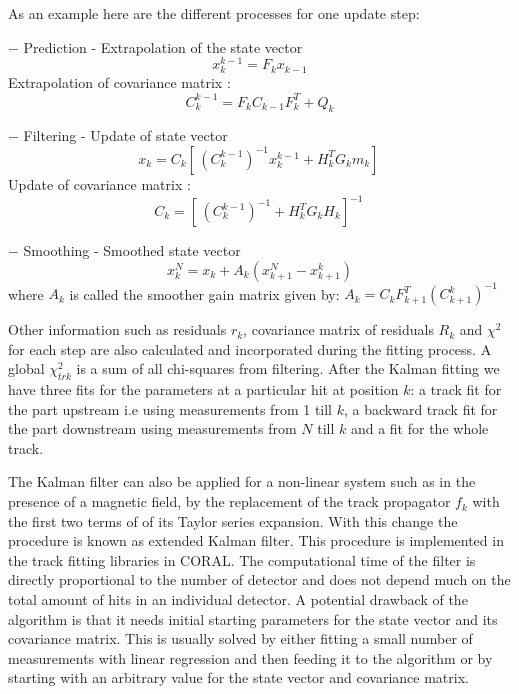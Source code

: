 As an example here are the different processes for one update step:

\begin{description}
\item $-$ Prediction - Extrapolation of the state vector
      \begin{equation}
        x_k^{k-1} = F_k x_{k-1}
      \end{equation}
      Extrapolation of covariance matrix :
      \begin{equation}
        C_k^{k-1} = F_k C_{k-1} F_k^T + Q_k
      \end{equation}

\item $-$ Filtering - Update of state vector
       \begin{equation}
         x_k = C_k [ \, (C^{k-1}_k)^{-1} x_k^{k-1} + H_k^T G_k m_k ] \,
       \end{equation}
       Update of covariance matrix :
       \begin{equation}
         C_k = [ \, (C^{k-1}_k)^{-1} + H_k^T G_k H_k ]^{-1} \,
       \end{equation}

\item $-$ Smoothing - Smoothed state vector
      \begin{equation}
        x_k^{N} = x_k + A_k(x_{k+1}^N - x_{k+1}^k)
      \end{equation}
      where $A_k$ is called the smoother gain matrix given by: $A_k = C_k F_{k+1} ^T (C_{k+1}^k)^{-1}$

\end{description}
Other information such as residuals $r_k$, covariance matrix of residuals $R_k$ and $\chi^2$ for each step are also calculated and incorporated during the fitting process. A global $\chi^2_{trk}$ is a sum of all chi-squares from filtering. After the Kalman fitting we have three fits for the parameters at a particular hit at position $k$: a track fit for the part upstream i.e  using measurements from 1 till $k$, a backward track fit for the part downstream using measurements from $N$ till $k$ and a fit for the whole track.

The Kalman filter can also be applied for a non-linear system such as in the presence of a magnetic field, by the replacement of the track propagator $f_k$ with the first two terms of of its Taylor series expansion. With this change the procedure is known as extended Kalman filter. This procedure is implemented in the track fitting libraries in CORAL. The computational time of the filter is directly proportional to the number of detector and does not depend much on the total amount of hits in an individual detector. A potential drawback of the algorithm is that it needs initial starting parameters for the state vector and its covariance matrix. This is usually solved by either fitting a small number of measurements with linear regression and then feeding it to the algorithm or by starting with an arbitrary value for the state vector and covariance matrix.

